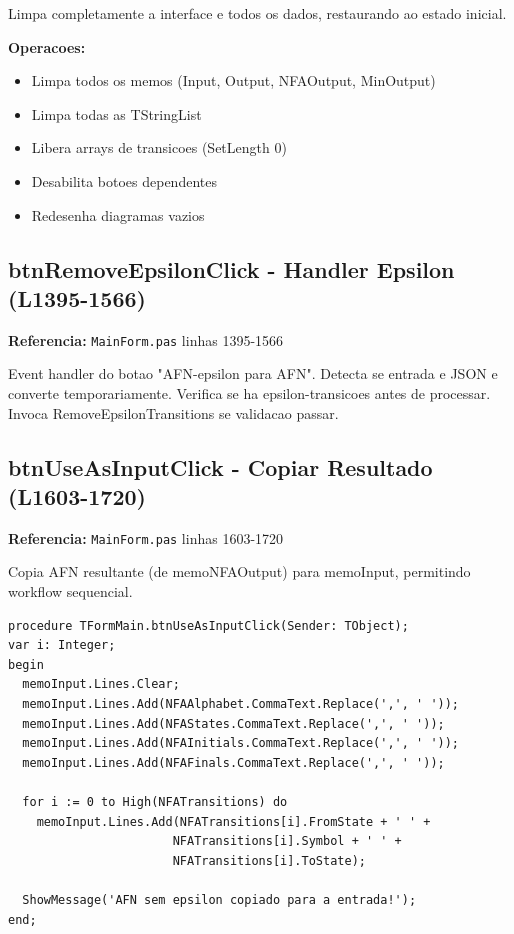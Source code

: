 \documentclass[12pt,a4paper]{article}
\begin{document}
Limpa completamente a interface e todos os dados, restaurando ao estado inicial.

\textbf{Operacoes:}
\begin{itemize}
    \item Limpa todos os memos (Input, Output, NFAOutput, MinOutput)
    \item Limpa todas as TStringList
    \item Libera arrays de transicoes (SetLength 0)
    \item Desabilita botoes dependentes
    \item Redesenha diagramas vazios
\end{itemize}

\subsection{btnRemoveEpsilonClick - Handler Epsilon (L1395-1566)}

\textbf{Referencia:} \texttt{MainForm.pas} linhas 1395-1566

Event handler do botao "AFN-epsilon para AFN". Detecta se entrada e JSON e converte temporariamente. Verifica se ha epsilon-transicoes antes de processar. Invoca RemoveEpsilonTransitions se validacao passar.

\subsection{btnUseAsInputClick - Copiar Resultado (L1603-1720)}

\textbf{Referencia:} \texttt{MainForm.pas} linhas 1603-1720

Copia AFN resultante (de memoNFAOutput) para memoInput, permitindo workflow sequencial.

\begin{lstlisting}[style=pascal, caption={btnUseAsInputClick}]
procedure TFormMain.btnUseAsInputClick(Sender: TObject);
var i: Integer;
begin
  memoInput.Lines.Clear;
  memoInput.Lines.Add(NFAAlphabet.CommaText.Replace(',', ' '));
  memoInput.Lines.Add(NFAStates.CommaText.Replace(',', ' '));
  memoInput.Lines.Add(NFAInitials.CommaText.Replace(',', ' '));
  memoInput.Lines.Add(NFAFinals.CommaText.Replace(',', ' '));
  
  for i := 0 to High(NFATransitions) do
    memoInput.Lines.Add(NFATransitions[i].FromState + ' ' + 
                       NFATransitions[i].Symbol + ' ' + 
                       NFATransitions[i].ToState);
  
  ShowMessage('AFN sem epsilon copiado para a entrada!');
end;
\end{lstlisting}
\end{document}
